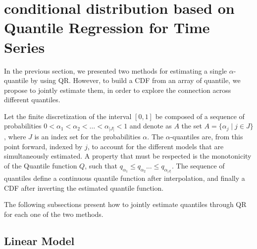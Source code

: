 \section{conditional distribution based on Quantile Regression for Time Series}

In the previous section, we presented two methods for estimating a single $\alpha$-quantile by using QR. However, to build a CDF from an array of quantile, we propose to jointly estimate them, in order to explore the connection across different quantiles. 

Let the finite discretization of the interval $[0,1]$ be composed of a sequence of probabilities $0 < \alpha_1 < \alpha_2 < \dots < \alpha_{|J|} < 1$ and denote as $A$ the set $A = \{ \alpha_j \mid j \in J \}$, where $J$ is an index set for the probabilities $\alpha$. 
The $\alpha$-quantiles are, from this point forward, indexed by $j$, to account for the different models that are simultaneously estimated. A property that must be respected is the monotonicity of the Quantile function $Q$, such that $q_{\alpha_1} \leq q_{\alpha_2} \dots \leq q_{\alpha_{|J|}}$.
The sequence of quantiles define a continuous quantile function after interpolation, and finally a CDF after inverting the estimated quantile function.

The following subsections present how to jointly estimate quantiles through QR for each one of the two methods.



\subsection{Linear Model}

